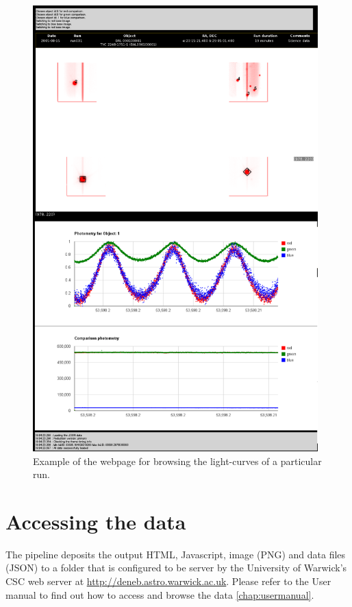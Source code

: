\begin{figure}[!h]
	\centering
	\includegraphics[width=110mm]{images/run031_on_the_night_of_2005-08-15.png}
	\caption{Example of the webpage for browsing the light-curves of a particular run.}
	\label{browser}
\end{figure}

  
\section{Accessing the data}
The pipeline deposits the output HTML, Javascript, image (PNG) and data files (JSON) to a folder that is configured to be server by the University of Warwick's CSC web server at \url{http://deneb.astro.warwick.ac.uk}. Please refer to the User manual to find out how to access and browse the data \ref{chap:usermanual}. 


